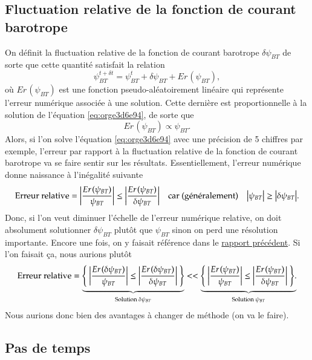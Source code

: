 \documentclass[10pt]{article}
\numberwithin{equation}{section}
\newcommand{\pt}{\hspace{1pt}}
\begin{document}
\subsection{Fluctuation relative de la fonction de courant barotrope}
\label{sec:org6efeded}
On définit la fluctuation relative de la fonction de courant barotrope \(\delta \psi_{BT}\) de sorte que cette quantité satisfait la relation
\begin{equation}
   \psi_{BT}^{t+\delta t} = \psi_{BT}^t + \delta \psi_{BT} + Er\pt(\psi_{BT}),
\end{equation}
où \(Er\pt(\psi_{BT})\) est une fonction pseudo-aléatoirement linéaire qui représente l'erreur numérique associée à une solution.
Cette dernière est proportionnelle à la solution de l'équation \ref{eq:orge3d6e94}, de sorte que
\begin{equation}
    Er\pt(\psi_{BT}) \propto \psi_{BT}.
\end{equation}
Alors, si l'on solve l'équation \ref{eq:orge3d6e94} avec une précision de 5 chiffres par exemple, l'erreur par rapport à la fluctuation relative de la fonction de courant barotrope va se faire sentir sur les résultats.
Essentiellement, l'erreur numérique donne naissance à l'inégalité suivante
\begin{align}
   &&\text{Erreur relative} = \abs{\frac{Er\pt(\psi_{BT})}{\psi_{BT}}} \le \abs{ \frac{Er\pt(\psi_{BT})}{\delta \psi_{BT}} } &&\text{car (généralement)} && \abs{\psi_{BT}} \ge \abs{\delta \psi_{BT}}. &&
\end{align}
Donc, si l'on veut diminuer l'échelle de l'erreur numérique relative, on doit absolument solutionner \(\delta \psi_{BT}\) plutôt que \(\psi_{BT}\) sinon on perd une résolution importante.
Encore une fois, on y faisait référence dans le \href{rapport-2023-04-28.org}{rapport précédent}.
Si l'on faisait ça, nous aurions plutôt
\begin{align}
   \text{Erreur relative} = \underbrace{\qty{\ \abs{\frac{Er\pt(\delta\psi_{BT})}{\psi_{BT}}} \le \abs{ \frac{Er\pt(\delta\psi_{BT})}{\delta \psi_{BT}} }\ }}_\text{Solution $\delta \psi_{BT}$}
   <<
   \underbrace{\qty{\ \abs{\frac{Er\pt(\psi_{BT})}{\psi_{BT}}} \le \abs{ \frac{Er\pt(\psi_{BT})}{\delta \psi_{BT}} }\ }.}_\text{Solution $\psi_{BT}$}
\end{align}
Nous aurions donc bien des avantages à changer de méthode (on va le faire).

\subsection{Pas de temps}
\label{sec:org55baf90}
\end{document}
